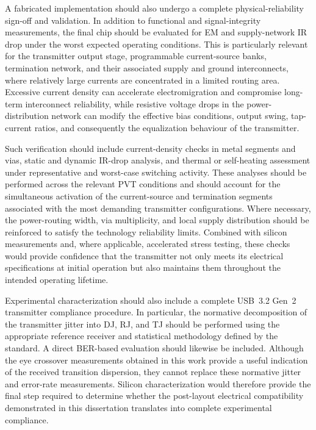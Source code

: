 A fabricated implementation should also undergo a complete physical-reliability sign-off and validation. In addition to functional and signal-integrity measurements, the final chip should be evaluated for \ac{EM} and supply-network IR drop under the worst expected operating conditions. This is particularly relevant for the transmitter output stage, programmable current-source banks, termination network, and their associated supply and ground interconnects, where relatively large currents are concentrated in a limited routing area. Excessive current density can accelerate electromigration and compromise long-term interconnect reliability, while resistive voltage drops in the power-distribution network can modify the effective bias conditions, output swing, tap-current ratios, and consequently the equalization behaviour of the transmitter.

Such verification should include current-density checks in metal segments and vias, static and dynamic IR-drop analysis, and thermal or self-heating assessment under representative and worst-case switching activity. These analyses should be performed across the relevant \ac{PVT} conditions and should account for the simultaneous activation of the current-source and termination segments associated with the most demanding transmitter configurations. Where necessary, the power-routing width, via multiplicity, and local supply distribution should be reinforced to satisfy the technology reliability limits. Combined with silicon measurements and, where applicable, accelerated stress testing, these checks would provide confidence that the transmitter not only meets its electrical specifications at initial operation but also maintains them throughout the intended operating lifetime.

Experimental characterization should also include a complete \ac{USB}~3.2 Gen~2 transmitter compliance procedure. In particular, the normative decomposition of the transmitter jitter into \ac{DJ}, \ac{RJ}, and \ac{TJ} should be performed using the appropriate reference receiver and statistical methodology defined by the standard. A direct \ac{BER}-based evaluation should likewise be included. Although the eye crossover measurements obtained in this work provide a useful indication of the received transition dispersion, they cannot replace these normative jitter and error-rate measurements. Silicon characterization would therefore provide the final step required to determine whether the post-layout electrical compatibility demonstrated in this dissertation translates into complete experimental compliance.

